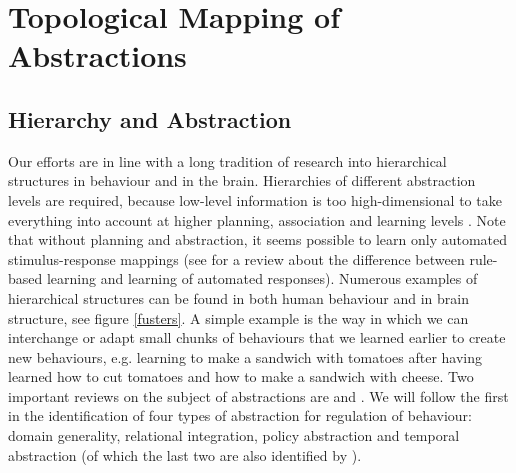 \documentclass[10pt,a4paper]{report}
\begin{document}
\section{Topological Mapping of Abstractions}

\subsection*{Hierarchy and Abstraction} 
Our efforts are in line with a long tradition of research into hierarchical structures in behaviour and in the brain. Hierarchies of different abstraction levels are required, because low-level information is too high-dimensional to take everything into account at higher planning, association and learning levels \citep{Lashley1951}. Note that without planning and abstraction, it seems possible to learn only automated stimulus-response mappings (see \citet{Dayan2009} for a review about the difference between rule-based learning and learning of automated responses). Numerous examples of hierarchical structures can be found in both human behaviour \citep{fuster2008prefrontal} and in brain structure, see figure \ref{fusters}. A simple example is the way in which we can interchange or adapt small chunks of behaviours that we learned earlier to create new behaviours, e.g. learning to make a sandwich with tomatoes after having learned how to cut tomatoes and how to make a sandwich with cheese. Two important reviews on the subject of abstractions are \citet{Badre2009} and \citet{Botvinick2008}. We will follow the first in the identification of four types of abstraction for regulation of behaviour: domain generality, relational integration, policy abstraction and temporal abstraction (of which the last two are also identified by \citet{Botvinick2008}). 
\end{document}
